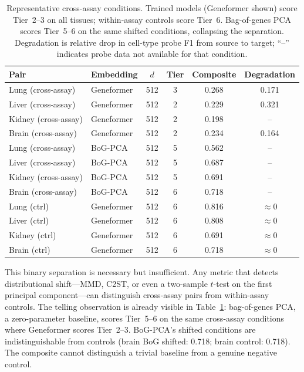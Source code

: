 \documentclass[9pt,lineno]{elife}
\begin{document}
\begin{table}[t]
\centering
\caption{Representative cross-assay conditions. Trained models (Geneformer shown) score Tier~2--3 on all tissues; within-assay controls score Tier~6. Bag-of-genes PCA scores Tier~5--6 on the same shifted conditions, collapsing the separation. Degradation is relative drop in cell-type probe F1 from source to target; ``--'' indicates probe data not available for that condition.}
\label{tab:separation}
\small
\begin{tabular}{@{}llcccc@{}}
\toprule
Pair & Embedding & $d$ & Tier & Composite & Degradation \\
\midrule
Lung (cross-assay) & Geneformer & 512 & 3 & 0.268 & 0.171 \\
Liver (cross-assay) & Geneformer & 512 & 2 & 0.229 & 0.321 \\
Kidney (cross-assay) & Geneformer & 512 & 2 & 0.198 & -- \\
Brain (cross-assay) & Geneformer & 512 & 2 & 0.234 & 0.164 \\
\midrule
Lung (cross-assay) & BoG-PCA & 512 & 5 & 0.562 & -- \\
Liver (cross-assay) & BoG-PCA & 512 & 5 & 0.687 & -- \\
Kidney (cross-assay) & BoG-PCA & 512 & 5 & 0.691 & -- \\
Brain (cross-assay) & BoG-PCA & 512 & 6 & 0.718 & -- \\
\midrule
Lung (ctrl) & Geneformer & 512 & 6 & 0.816 & $\approx 0$ \\
Liver (ctrl) & Geneformer & 512 & 6 & 0.808 & $\approx 0$ \\
Kidney (ctrl) & Geneformer & 512 & 6 & 0.691 & $\approx 0$ \\
Brain (ctrl) & Geneformer & 512 & 6 & 0.718 & $\approx 0$ \\
\bottomrule
\end{tabular}
\end{table}

This binary separation is necessary but insufficient. Any metric that detects distributional shift---MMD, C2ST, or even a two-sample $t$-test on the first principal component---can distinguish cross-assay pairs from within-assay controls. The telling observation is already visible in Table~\ref{tab:separation}: bag-of-genes PCA, a zero-parameter baseline, scores Tier~5--6 on the same cross-assay conditions where Geneformer scores Tier~2--3. BoG-PCA's shifted conditions are indistinguishable from controls (brain BoG shifted: 0.718; brain control: 0.718). The composite cannot distinguish a trivial baseline from a genuine negative control.
\end{document}
